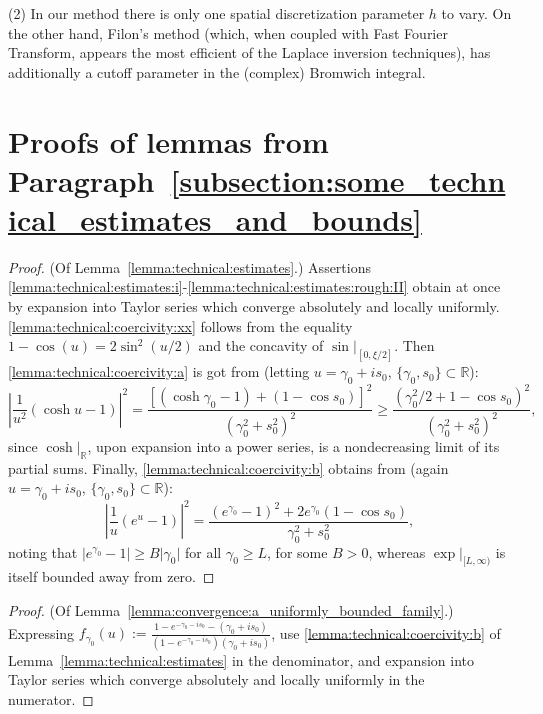 \documentclass[pdftex,oneside,11pt,reqno]{amsart}
\theoremstyle{definition}
\theoremstyle{theorem}
\theoremstyle{remark}
\numberwithin{equation}{section}
\numberwithin{definition}{section}
\begin{document}
\noindent (2) In our method there is only one spatial discretization parameter $h$ to vary. On the other hand, Filon's method (which, when coupled with Fast Fourier Transform, appears the most efficient of the Laplace inversion techniques), has additionally a cutoff parameter in the (complex) Bromwich integral.




\appendix

\section{Proofs of lemmas from Paragraph~\ref{subsection:some_technical_estimates_and_bounds}}\label{appendix:technical_lemmas}
\begin{proof}(Of Lemma~\ref{lemma:technical:estimates}.)
Assertions \ref{lemma:technical:estimates:i}-\ref{lemma:technical:estimates:rough:II} obtain at once by expansion into Taylor series which converge absolutely and locally uniformly. \ref{lemma:technical:coercivity:xx} follows from the equality $1-\cos(u)=2\sin^2(u/2)$ and the concavity of $\sin\vert_{[0,\xi/2]}$. Then \ref{lemma:technical:coercivity:a} is got from (letting $u=\gamma_0+is_0$, $\{\gamma_0, s_0\}\subset \mathbb{R}$): $$\left\vert \frac{1}{u^2}\left(\cosh u-1\right)\right\vert^2=\frac{\left[(\cosh\gamma_0-1)+(1-\cos s_0)\right]^2}{(\gamma_0^2+s_0^2)^2}\geq \frac{(\gamma_0^2/2+1-\cos s_0)^2}{(\gamma_0^2+s_0^2)^2},$$ since $\cosh\vert_{\mathbb{R}}$, upon expansion into a power series, is a nondecreasing limit of its partial sums. Finally, \ref{lemma:technical:coercivity:b} obtains from (again $u=\gamma_0+is_0$, $\{\gamma_0, s_0\}\subset \mathbb{R}$): $$\left\vert \frac{1}{u}\left( e^u-1\right)\right\vert^2=\frac{(e^{\gamma_0}-1)^2+2e^{\gamma_0}(1-\cos s_0)}{\gamma_0^2+s_0^2},$$ noting that $\vert e^{\gamma_0}-1\vert\geq  B\vert\gamma_0\vert$ for all $\gamma_0\geq L$, for some $B>0$, whereas $\exp\vert_{[L,\infty)}$ is itself bounded away from zero.
\end{proof}

\begin{proof}(Of Lemma~\ref{lemma:convergence:a_uniformly_bounded_family}.)
Expressing $f_{\gamma_0}(u):=\frac{1-e^{-\gamma_0-is_0}-(\gamma_0+is_0)}{(1-e^{-\gamma_0-is_0})(\gamma_0+is_0)}$, use \ref{lemma:technical:coercivity:b} of Lemma~\ref{lemma:technical:estimates} in the denominator, and expansion into Taylor series which converge absolutely and locally uniformly in the numerator. 
\end{proof}
\end{document}
